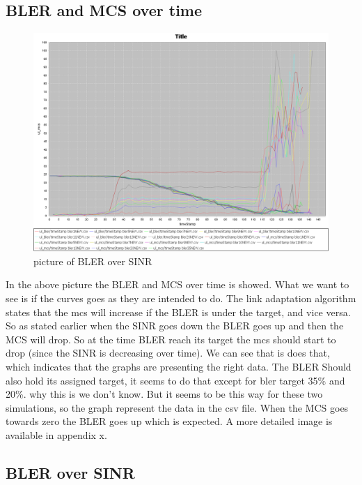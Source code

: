 \documentclass[cropmarks, frame, english]{idamasterthesis}
\begin{document}
\newpage
\subsection{BLER and MCS over time}

\begin{figure}[h]
\includegraphics[width=\textwidth]{ulBLER_And_MCS_OverTime}
\centering
\caption{picture of BLER over SINR}
\end{figure}

In the above picture the BLER and MCS over time is showed. What we want to see is if the curves goes as they are intended to do. The link adaptation algorithm states that the mcs will increase if the BLER is under the target, and vice versa. So as stated earlier when the SINR goes down the BLER goes up and then the MCS will drop. So at the time BLER reach its target the mcs should start to drop (since the SINR is decreasing over time). We can see that is does that, which indicates that the graphs are presenting the right data. The BLER Should also hold its assigned target, it seems to do that except for bler target 35\% and 20\%. why this is we don't know. But it seems to be this way for these two simulations, so the graph represent the data in the csv file. When the MCS goes towards zero the BLER goes up which is expected. A more detailed image is available in appendix x.
\newpage
\subsection{BLER over SINR}
\end{document}
